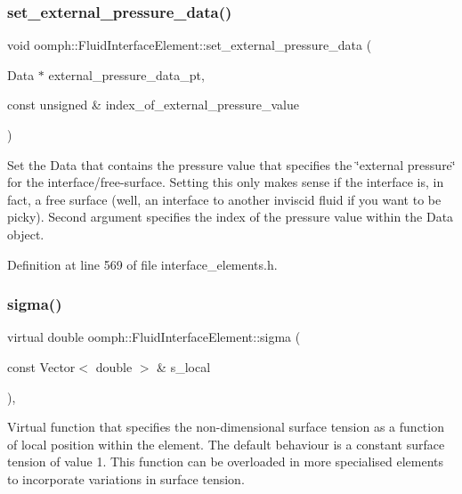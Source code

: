 \subsubsection{\texorpdfstring{set\+\_\+external\+\_\+pressure\+\_\+data()}{set\_external\_pressure\_data()}\hspace{0.1cm}{\footnotesize\ttfamily [2/2]}}
{\footnotesize\ttfamily void oomph\+::\+Fluid\+Interface\+Element\+::set\+\_\+external\+\_\+pressure\+\_\+data (\begin{DoxyParamCaption}\item[{Data $\ast$}]{external\+\_\+pressure\+\_\+data\+\_\+pt,  }\item[{const unsigned \&}]{index\+\_\+of\+\_\+external\+\_\+pressure\+\_\+value }\end{DoxyParamCaption})\hspace{0.3cm}{\ttfamily [inline]}}



Set the Data that contains the pressure value that specifies the \char`\"{}external pressure\char`\"{} for the interface/free-\/surface. Setting this only makes sense if the interface is, in fact, a free surface (well, an interface to another inviscid fluid if you want to be picky). Second argument specifies the index of the pressure value within the Data object. 



Definition at line 569 of file interface\+\_\+elements.\+h.

\mbox{\label{classoomph_1_1FluidInterfaceElement_a7e5c3ca1eba5d4dd44c0eab9be252c2a}} 
\subsubsection{\texorpdfstring{sigma()}{sigma()}}
{\footnotesize\ttfamily virtual double oomph\+::\+Fluid\+Interface\+Element\+::sigma (\begin{DoxyParamCaption}\item[{const Vector$<$ double $>$ \&}]{s\+\_\+local }\end{DoxyParamCaption})\hspace{0.3cm}{\ttfamily [inline]}, {\ttfamily [virtual]}}



Virtual function that specifies the non-\/dimensional surface tension as a function of local position within the element. The default behaviour is a constant surface tension of value 1. This function can be overloaded in more specialised elements to incorporate variations in surface tension. 



